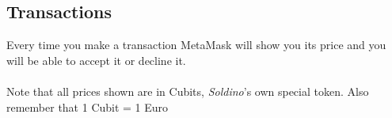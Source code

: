 	\subsection{Transactions}
	Every time you make a transaction MetaMask will show you its price and you 
	will be able to accept it or decline it.\\ \\
	Note that all prices shown are in Cubits, \textit{Soldino}'s own special token.
	Also remember that 1 Cubit = 1 Euro
	
	
	
	